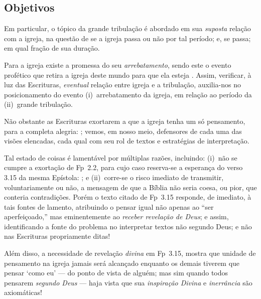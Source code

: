     \subsection{Objetivos}

    Em particular, o tópico da grande tribulação é abordado em sua \emph{suposta} relação com a  igreja,  na  questão  de  se  a
    igreja passa ou não por tal período; e, se passa; em qual fração de sua duração.

    Para a igreja existe a promessa do seu \emph{arrebatamento}, sendo este o evento profético que retira a igreja  deste  mundo
    para que ela esteja  .  Assim,  verificar,  à  luz  das  Escrituras,
    \emph{eventual} relação entre igreja e a tribulação, auxilia-nos no posicionamento do evento (i)~arrebatamento da igreja, em
    relação ao período da (ii)~grande tribulação.


    Não obstante as Escrituras exortarem a que a igreja tenha um só pensamento, para a completa alegria: ; vemos, em nosso meio, defensores de cada uma das visões elencadas,  cada  qual  com  seu  rol  de
    textos e estratégias de interpretação.

    Tal estado de coisas é lamentável por múltiplas razões, incluindo: (i)~não se cumpre a exortação de Fp~2.2, para  cujo  caso
    reserva-se a esperança do verso 3.15 da mesma Epístola: ; e  (ii)~corre-se
    o risco imediato de transmitir, voluntariamente ou não, a mensagem de que a Bíblia não seria coesa, ou  pior,  que  conteria
    contradições. Porém o texto citado de Fp~3.15 responde, de imediato, à tais fontes de lamento, atribuindo o pensar igual não
    apenas ao ``ser aperfeiçoado,'' mas eminentemente ao \emph{receber revelação de Deus}; e assim,  identificando  a  fonte  do
    problema no interpretar textos não segundo Deus; e não nas Escrituras propriamente ditas!

    Além disso, a necessidade de revelação \emph{divina} em Fp~3.15, mostra que unidade de  pensamento  na  igreja  jamais  será
    alcançado enquanto os demais tiverem que pensar `como eu' --- do ponto de vista de alguém; mas  sim  quando  todos  pensarem
    \emph{segundo Deus} --- haja vista que sua \emph{inspiração Divina} e \emph{inerrância} são axiomáticas!

